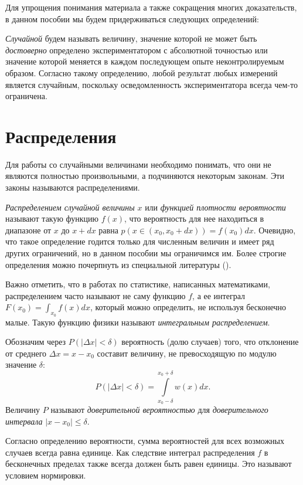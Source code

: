 Для упрощения понимания материала а также сокращения многих доказательств, в данном пособии мы будем придерживаться следующих определений:

\emph{Случайной} будем называть величину, значение которой не может быть \emph{достоверно} определено экспериментатором с абсолютной точностью или значение которой меняется в каждом последующем опыте неконтролируемым образом. Согласно такому определению, любой результат любых измерений является случайным, поскольку осведомленность экспериментатора всегда чем-то ограничена.

\section{Распределения}

Для работы со случайными величинами необходимо понимать, что они не являются полностью произвольными, а подчиняются некоторым законам. Эти законы называются распределениями.

\emph{Распределением случайной величины} $x$ или \emph{функцией плотности вероятности} называют такую функцию $f(x)$, что вероятность для нее находиться в диапазоне от $x$ до $x+dx$ равна $p(x \in (x_0, x_0+dx)) = f(x_0) dx$. Очевидно, что такое определение годится только для численным величин и имеет ряд других ограничений, но в данном пособии мы ограничимся им. Более строгие определения можно почерпнуть из специальной литературы ().

Важно отметить, что в работах по статистике, написанных математиками, распределением часто называют не саму функцию $f$, а ее интеграл $F(x_0) = \int_{x_0}{f(x)dx}$, который можно определить, не используя бесконечно малые. Такую функцию физики называют \emph{интегральным распределением}.

Обозначим через $P\!\left(\left|\Delta x\right|<\delta\right)$ вероятность
(долю случаев) того, что отклонение от среднего $\Delta x=x-x_{0}$
составит величину, не превосходящую по модулю значение $\delta$:
\[
P\left(\left|\Delta x\right|<\delta\right)=\int\limits _{x_{0}-\delta}^{x_{0}+\delta}w\!\left(x\right)dx.
\]
Величину $P$ называют \emph{доверительной вероятностью} для \emph{доверительного
интервала} $\left|x-x_{0}\right|\le\delta$. 

Согласно определению вероятности, сумма вероятностей для всех возможных случаев всегда равна единице. Как следствие интеграл распределения $f$ в бесконечных пределах также всегда должен быть равен единицы. Это называют условием нормировки.


